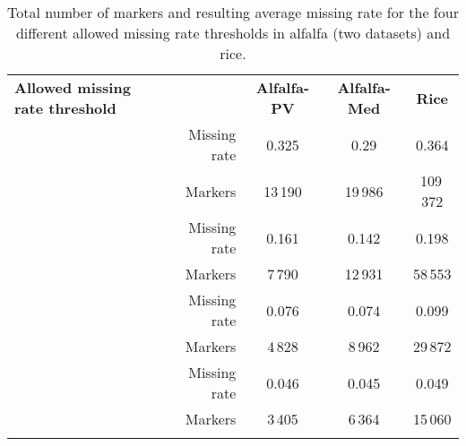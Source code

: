 
\begin{table}
\centering
\caption[Markers counts and missing rates]{
Total number of markers and resulting average missing rate for the four different allowed missing rate thresholds in alfalfa (two datasets) and rice.}
\label{tab:missing_rates}
\begin{tabular}{C{3cm}rccc}
\hline\noalign{\smallskip}
\noalign{\smallskip}\hline\noalign{\smallskip}
\textbf{Allowed missing rate threshold} &  & \textbf{Alfalfa-PV} & \textbf{Alfalfa-Med} & \textbf{Rice}\\
\noalign{\smallskip}\Xhline{3\arrayrulewidth}\noalign{\smallskip}
    & Missing rate &  0.325 & 0.29  & 0.364\\
                           & Markers      & 13\,190  & 19\,986 & 109\,372\\    
\noalign{\smallskip}\hline
    & Missing rate &  0.161 & 0.142 & 0.198\\
                           & Markers      & 7\,790 & 12\,931 & 58\,553\\    
\noalign{\smallskip}\hline
    & Missing rate & 0.076 & 0.074 & 0.099\\
                           & Markers      & 4\,828 & 8\,962 & 29\,872\\
\noalign{\smallskip}\hline                           
    & Missing rate & 0.046 & 0.045 & 0.049\\
                           & Markers      & 3\,405 & 6\,364 & 15\,060 \\
\noalign{\smallskip}\hline
\end{tabular}
\end{table}







